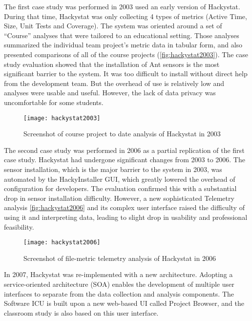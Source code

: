 The first case study was performed in 2003 used an early version of Hackystat\cite{csdl2-03-13}. During that time, Hackystat was only collecting 4 types of metrics (Active Time, Size, Unit Tests and Coverage). The system was oriented around a set of ``Course'' analyses that were tailored to an educational setting. Those analyses summarized the individual team project's metric data in tabular form, and also presented comparisons of all of the course projects (\autoref{fig:hackystat2003}). The case study evaluation showed that the installation of Ant sensors is the most significant barrier to the system. It was too difficult to install without direct help from the development team. But the overhead of use is relatively low and analyses were usable and useful. However, the lack of data privacy was uncomfortable for some students.

\begin{figure}[htbp]
   \centering
   \texttt{[image: hackystat2003]} 
   \caption{Screenshot of course project to date analysis of Hackystat in 2003}
   \label{fig:hackystat2003}
\end{figure}

The second case study was performed in 2006 as a partial replication of the first case study\cite{csdl2-07-02}. Hackystat had undergone significant changes from 2003 to 2006. The sensor installation, which is the major barrier to the system in 2003, was automated by the HackyInstaller GUI, which greatly lowered the overhead of configuration for developers. The evaluation confirmed this with a substantial drop in sensor installation difficulty. However, a new sophisticated Telemetry analysis \autoref{fig:hackystat2006} and its complex user interface raised the difficulty of using it and interpreting data, leading to slight drop in usability and professional feasibility.

\begin{figure}[htbp]
   \centering
   \texttt{[image: hackystat2006]} 
   \caption{Screenshot of file-metric telemetry analysis of Hackystat in 2006}
   \label{fig:hackystat2006}
\end{figure}

In 2007, Hackystat was re-implemented with a new architecture. Adopting a service-oriented architecture (SOA)\cite{soa} enables the development of multiple user interfaces to separate from the data collection and analysis components. The Software ICU is built upon a new web-based UI called Project Browser, and the classroom study is also based on this user interface.


